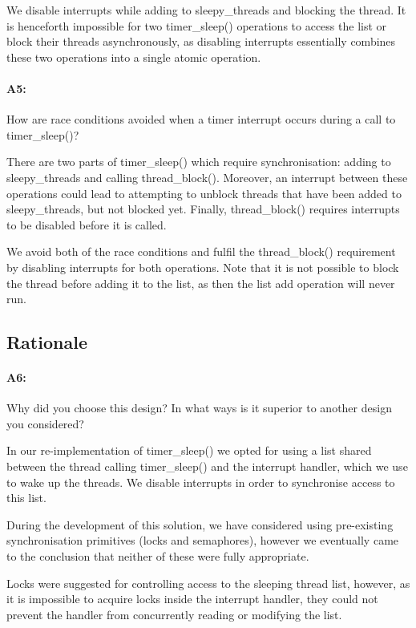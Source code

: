 \documentclass[11pt]{article}
\begin{document}
We disable interrupts while adding to sleepy\_threads and blocking the thread. It is henceforth impossible for two timer\_sleep() operations to access the list or block their threads asynchronously, as disabling interrupts essentially combines these two operations into a single atomic operation.

\paragraph{A5:}
How are race conditions avoided when a timer interrupt occurs during a call to timer\_sleep()?

There are two parts of timer\_sleep() which require synchronisation: adding to sleepy\_threads and calling thread\_block(). Moreover, an interrupt between these operations could lead to attempting to unblock threads that have been added to sleepy\_threads, but not blocked yet. Finally, thread\_block() requires interrupts to be disabled before it is called.

We avoid both of the race conditions and fulfil the thread\_block() requirement by disabling interrupts for both operations. Note that it is not possible to block the thread before adding it to the list, as then the list add operation will never run.

\subsection{Rationale}
\paragraph{A6:}
Why did you choose this design? In what ways is it superior to another design you considered?

In our re-implementation of timer\_sleep() we opted for using a list shared between the thread calling timer\_sleep() and the interrupt handler, which we use to wake up the threads. We disable interrupts in order to synchronise access to this list.

During the development of this solution, we have considered using pre-existing synchronisation primitives (locks and semaphores), however we eventually came to the conclusion that neither of these were fully appropriate.

Locks were suggested for controlling access to the sleeping thread list, however, as it is impossible to acquire locks inside the interrupt handler, they could not prevent the handler from concurrently reading or modifying the list.
\end{document}
